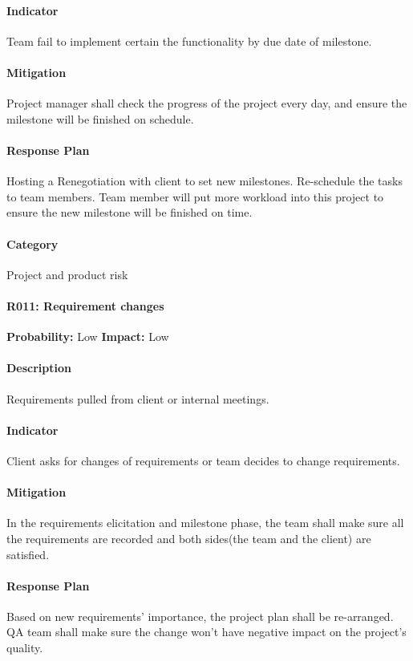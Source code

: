\documentclass[11pt, a4paper]{report}
\begin{document}
	\paragraph{Indicator}Team fail to implement certain the functionality by due date of milestone. 
	\paragraph{Mitigation}Project manager shall check the progress of the project every day, and ensure the milestone will be finished on schedule. 
	\paragraph{Response Plan}Hosting a Renegotiation with client to set new milestones. Re-schedule the tasks to team members. Team member will put more workload into this project to ensure the new milestone will be finished on time.\\
	\paragraph{Category} Project and product risk

\pagebreak

	\paragraph{R011: Requirement changes} \hspace{1cm} \textbf{Probability: }Low\hspace{1cm}   \textbf{Impact: }Low
	\paragraph{Description}Requirements pulled from client or internal meetings.
	\paragraph{Indicator}Client asks for changes of requirements or team decides to change requirements.  
	\paragraph{Mitigation}In the requirements elicitation and milestone phase, the team shall make sure all the requirements are recorded and both sides(the team and the client) are satisfied.
	\paragraph{Response Plan}Based on new requirements' importance, the project plan shall be re-arranged. QA team shall make sure the change won't have negative impact on the project's quality. \\
\end{document}
